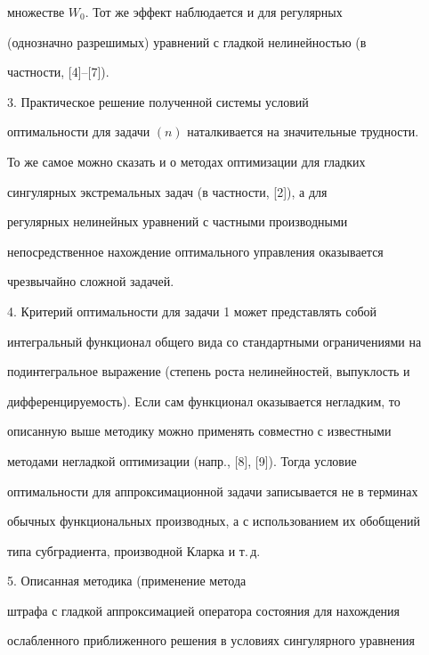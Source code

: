 множестве $W_0$. Тот же эффект наблюдается и для регулярных 


(однозначно разрешимых) уравнений с гладкой нелинейностью (в 


частности, [4]--[7]). 


\smallskip 


 


3. Практическое решение полученной системы условий 


оптимальности для задачи $(n)$ наталкивается на значительные трудности. 


То же самое можно сказать и о методах оптимизации для гладких 


сингулярных экстремальных задач (в частности, [2]), а для 


регулярных нелинейных уравнений с частными производными 


непосредственное нахождение оптимального управления оказывается 


чрезвычайно сложной задачей. 


\smallskip 


 


4. Критерий оптимальности для задачи 1 может представлять собой 


интегральный функционал общего вида со стандартными ограничениями на 


подинтегральное выражение (степень роста нелинейностей, выпуклость и 


дифференцируемость). Если сам функционал оказывается негладким, то 


описанную выше методику можно применять совместно с известными 


методами негладкой оптимизации (напр., [8], [9]). Тогда условие 


оптимальности для аппроксимационной задачи записывается не в терминах 


обычных функциональных производных, а с использованием их обобщений 


типа субградиента, производной Кларка и т.\,д. 


\smallskip 


 


5. Описанная методика (применение метода 


штрафа с гладкой аппроксимацией оператора состояния для нахождения 


ослабленного приближенного решения в условиях сингулярного уравнения 



